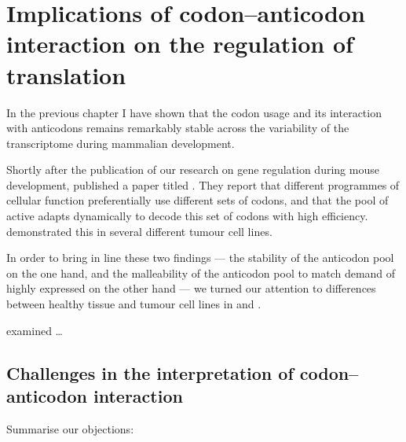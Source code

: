 \chapter{Implications of codon–anticodon interaction on the regulation of translation}

In the previous chapter I have shown that the codon usage and its interaction
with \trna anticodons remains remarkably stable across the variability of the
transcriptome during mammalian development.

Shortly after the publication of our research on \trna gene regulation during
mouse development, \citet{Gingold:2014} published a paper titled . They report that different programmes of cellular function
preferentially use different sets of codons, and that the pool of active
\trna[s] adapts dynamically to decode this set of codons with high efficiency.
\citet{Gingold:2014} demonstrated this in several different tumour cell lines.

In order to bring in line these two findings — the stability of the anticodon
pool on the one hand, and the malleability of the anticodon pool to match demand
of highly expressed on the other hand — we turned our attention to differences
between healthy tissue and tumour cell lines in \mmu and \hsa.

\citet{Gingold:2014} examined …


\section{Challenges in the interpretation of codon–anticodon interaction}

Summarise our objections:

